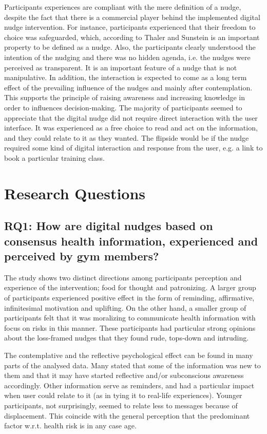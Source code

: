 Participants experiences are compliant with the mere definition of a nudge, despite the fact that there is a commercial player behind the implemented digital nudge intervention. For instance, participants experienced that their freedom to choice was safeguarded, which, according to Thaler and Sunstein \cite{thaler_nudge-_2009} is an important property to be defined as a nudge. Also, the participants clearly understood the intention of the nudging and there was no hidden agenda, i.e. the nudges were perceived as transparent. It is an important feature of a nudge that is not manipulative\cite{karlsen_recommendations_2019}. In addition, the interaction is expected to come as a long term effect of the prevailing influence of the nudges and mainly after contemplation. This supports the principle of raising awareness and increasing knowledge in order to influences decision-making. The majority of participants seemed to appreciate that the digital nudge did not require direct interaction with the user interface. It was experienced as a free choice to read and act on the information, and they could relate to it as they wanted. The flipside would be if the nudge required some kind of digital interaction and response from the user, e.g. a link to book a particular training class.

\section{Research Questions}
\subsection{RQ1: How are digital nudges based on consensus health information, experienced and perceived by gym members?}

The study shows two distinct directions among participants perception and experience of the intervention; food for thought and patronizing. A larger group of participants experienced positive effect in the form of reminding, affirmative, infinitesimal motivation and uplifting. On the other hand, a smaller group of participants felt that it was moralizing to communicate health information with focus on risks in this manner. These participants had particular strong opinions about the loss-framed nudges that they found rude, tops-down and intruding.  

The contemplative and the reflective psychological effect can be found in many parts of the analysed data. Many stated that some of the information was new to them and that it may have started reflective and/or subconscious awareness accordingly. Other information serve as reminders, and had a particular impact when user could relate to it (as in tying it to real-life experiences). Younger participants, not surprisingly, seemed to relate less to messages because of displacement. This coincide with the general perception that the predominant factor w.r.t. health risk is in any case age.


